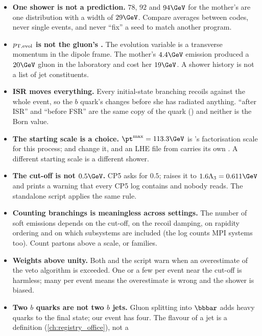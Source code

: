 \begin{pitfalls}
\begin{itemize}[nosep]
  \item \textbf{One shower is not a prediction.} $78$, $92$ and $94\GeV$
    for the mother's \pt are one distribution with a width of $29\GeV$.
    Compare averages between codes, never single events, and never ``fix''
    a seed to match another program.
  \item \textbf{$p_{\mathrm{T,evol}}$ is not the gluon's \pt.} The evolution
    variable is a transverse momentum in the dipole frame. The mother's
    $4.4\GeV$ emission produced a $20\GeV$ gluon in the laboratory and cost
    her $19\GeV$. A shower history is not a list of jet constituents.
  \item \textbf{ISR moves everything.} Every initial-state branching
    recoils against the whole event, so the $b$ quark's \pt changes before
    she has radiated anything. ``\pt after ISR'' and ``\pt before FSR'' are
    the same copy of the quark () and neither is
    the Born value.
  \item \textbf{The starting scale is a choice.} $\pt^{\max}=113.3\GeV$ is
    \PYTHIA's factorisation scale for this process;  and
     change it, and an LHE file from \MG carries its own
    . A different starting scale is a different shower.
  \item \textbf{The cut-off is not $0.5\GeV$.} CP5 asks for $0.5$;
    \PYTHIA raises it to $1.6\Lambda_3=0.611\GeV$ and prints a warning that
    every CP5 log contains and nobody reads. The standalone script applies
    the same rule.
  \item \textbf{Counting branchings is meaningless across settings.} The
    number of soft emissions depends on the cut-off, on the recoil damping,
    on rapidity ordering and on which subsystems are included (the \CMSSW
    log counts MPI systems too). Count partons above a scale, or families.
  \item \textbf{Weights above unity.} Both \PYTHIA and the script warn when
    an overestimate of the veto algorithm is exceeded. One or a few per
    event near the cut-off is harmless; many per event means the
    overestimate is wrong and the shower is biased.
  \item \textbf{Two $b$ quarks are not two $b$ jets.} Gluon splitting into
    $\bbbar$ adds heavy quarks to the final state; our event has four. The
    flavour of a jet is a definition (\cref{ch:registry_office}), not a

\end{itemize}
\end{pitfalls}
